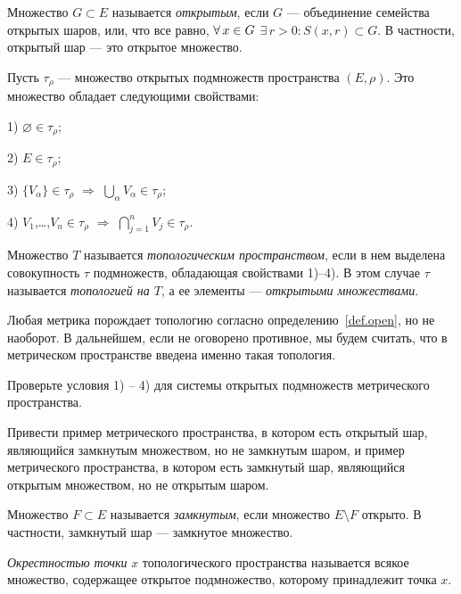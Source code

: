 \documentclass[10pt,titlepage, a4paper]{article}
\begin{document}
\begin{defen}\label{def.open}
Множество $G\subset E$ называется \emph{открытым}, если $G$ ---
объединение семейства открытых шаров, или, что все равно, $\forall\,
x\p\in G$ $\exists\,r>0: S(x,r)\subset G$. В частности, открытый шар
--- это открытое множество.
\end{defen}

Пусть $\tau_\rho$ --- множество открытых подмножеств пространства
$(E,\rho)$. Это множество обладает следующими свойствами:

1) $\varnothing\in \tau_\rho$;

2) $E\in\tau_\rho$;

3) $\{V_\alpha\}\in\tau_\rho$ $\Rightarrow$ $\bigcup\limits_\alpha
V_\alpha\in\tau_\rho$;

4) $V_1$,\ldots,$V_n\in\tau_\rho$ $\Rightarrow$
$\bigcap\limits_{j=1}^nV_j\in\tau_\rho$.

\begin{defen}
Множество $T$ называется \emph{топологическим простра\-нством}, если
в нем выделена совокупность $\tau$ подмножеств, обладающая
свойствами 1)--4). В этом случае $\tau$ называется \emph{топологией
на $T$}, а ее элементы --- \emph{открытыми множествами}.
\end{defen}

\begin{zam}
Любая метрика порождает топологию согласно
определению~\ref{def.open}, но не наоборот. В дальнейшем, если не
оговорено противное, мы будем считать, что в метрическом
пространстве введена именно такая топология.
\end{zam}

\begin{upr}
Проверьте условия 1) -- 4) для системы открытых подмножеств
метрического пространства.
\end{upr}

\begin{upr}
Привести пример метрического пространства, в котором есть открытый
шар, являющийся замкнутым множеством, но не замкнутым шаром, и
пример метрического пространства, в котором есть замкнутый шар,
являющийся открытым множеством, но не открытым шаром.
\end{upr}

\begin{defen}
Множество $F\subset E$ называется \emph{замкнутым}, если множество
$E\setminus F$ открыто. В частности, замкнутый шар --- замкнутое
множество.

\emph{Окрестностью точки} $x$ топологического пространства
называется всякое множество, содержащее открытое подмножество,
которому принадлежит точка $x$.
\end{defen}
\end{document}
